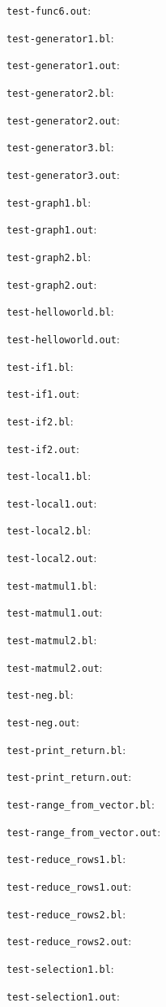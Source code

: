 \verb=test-func6.out=:

\verb=test-generator1.bl=:

\verb=test-generator1.out=:

\verb=test-generator2.bl=:

\verb=test-generator2.out=:

\verb=test-generator3.bl=:

\verb=test-generator3.out=:

\verb=test-graph1.bl=:

\verb=test-graph1.out=:

\verb=test-graph2.bl=:

\verb=test-graph2.out=:

\verb=test-helloworld.bl=:

\verb=test-helloworld.out=:

\verb=test-if1.bl=:

\verb=test-if1.out=:

\verb=test-if2.bl=:

\verb=test-if2.out=:

\verb=test-local1.bl=:

\verb=test-local1.out=:

\verb=test-local2.bl=:

\verb=test-local2.out=:

\verb=test-matmul1.bl=:

\verb=test-matmul1.out=:

\verb=test-matmul2.bl=:

\verb=test-matmul2.out=:

\verb=test-neg.bl=:

\verb=test-neg.out=:

\verb=test-print_return.bl=:

\verb=test-print_return.out=:

\verb=test-range_from_vector.bl=:

\verb=test-range_from_vector.out=:

\verb=test-reduce_rows1.bl=:

\verb=test-reduce_rows1.out=:

\verb=test-reduce_rows2.bl=:

\verb=test-reduce_rows2.out=:

\verb=test-selection1.bl=:

\verb=test-selection1.out=:

